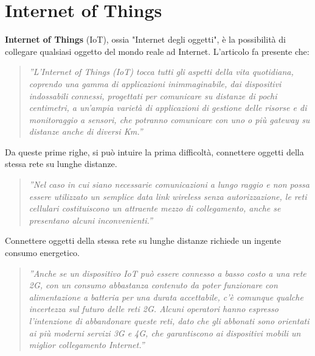\documentclass[a4paper]{report} %
\begin{document}
\section{Internet of Things}
\textbf{Internet of Things} (IoT), ossia "Internet degli oggetti", è la possibilità di collegare qualsiasi oggetto del mondo reale ad Internet. L'articolo \cite{art:rif.20} fa presente che:
\begin{quote}
	\textit{''L'Internet of Things (IoT) tocca tutti gli aspetti della vita quotidiana, coprendo una gamma di applicazioni inimmaginabile, dai dispositivi indossabili connessi, progettati per comunicare su distanze di pochi centimetri, a un'ampia varietà di applicazioni di gestione delle risorse e di monitoraggio a sensori, che potranno comunicare con uno o più gateway su distanze anche di diversi Km.''}
\end{quote}
Da queste prime righe, si può intuire la prima difficoltà, connettere oggetti della stessa rete su lunghe distanze.
\begin{quote}
	\textit{''Nel caso in cui siano necessarie comunicazioni a lungo raggio e non possa essere utilizzato un semplice data link wireless senza autorizzazione, le reti cellulari costituiscono un attraente mezzo di collegamento, anche se presentano alcuni inconvenienti.''}
\end{quote}
Connettere oggetti della stessa rete su lunghe distanze richiede un ingente consumo energetico.
\begin{quote}
	 \textit{''Anche se un dispositivo IoT può essere connesso a basso costo a una rete 2G, con un consumo abbastanza contenuto da poter funzionare con alimentazione a batteria per una durata accettabile, c'è comunque qualche incertezza sul futuro delle reti 2G. Alcuni operatori hanno espresso l'intenzione di abbandonare queste reti, dato che gli abbonati sono orientati ai più moderni servizi 3G e 4G, che garantiscono ai dispositivi mobili un miglior collegamento Internet.''}
\end{quote}
\end{document}
